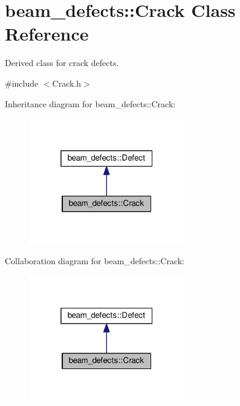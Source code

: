\hypertarget{classbeam__defects_1_1_crack}{}\section{beam\+\_\+defects\+:\+:Crack Class Reference}
\label{classbeam__defects_1_1_crack}


Derived class for crack defects.  




{\ttfamily \#include $<$Crack.\+h$>$}



Inheritance diagram for beam\+\_\+defects\+:\+:Crack\+:\nopagebreak
\begin{figure}[H]
\begin{center}
\leavevmode
\includegraphics[width=193pt]{classbeam__defects_1_1_crack__inherit__graph}
\end{center}
\end{figure}


Collaboration diagram for beam\+\_\+defects\+:\+:Crack\+:\nopagebreak
\begin{figure}[H]
\begin{center}
\leavevmode
\includegraphics[width=193pt]{classbeam__defects_1_1_crack__coll__graph}
\end{center}
\end{figure}
